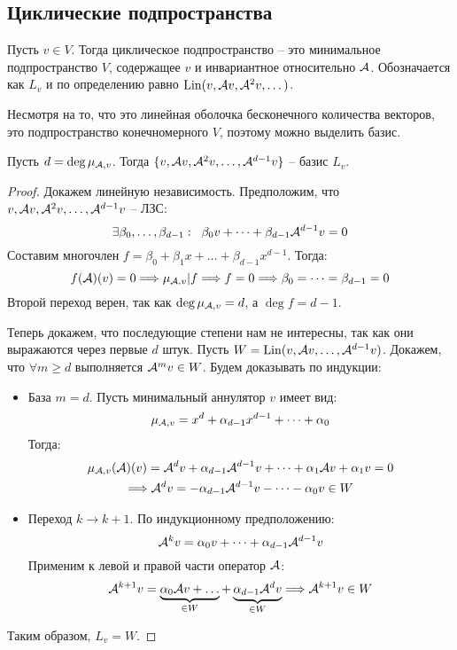 \subsection{Циклические подпространства}

\begin{conj}
    Пусть $v \in V$.
    Тогда циклическое подпространство -- это минимальное подпространство $V$, содержащее $v$ и инвариантное относительно $\mathcal{A}$.
    Обозначается как $L_v$ и по определению равно $\operatorname{Lin} (v, \mathcal{A} v, \mathcal{A}^2 v, \dots)$.
\end{conj}

\vspace*{3mm}

Несмотря на то, что это линейная оболочка бесконечного количества векторов, это подпространство конечномерного $V$, поэтому можно выделить базис.

\vspace*{2mm}

\begin{theorem}
    Пусть $d = \deg \mu_{\mathcal{A}, v}$.
    Тогда $\{ v, \mathcal{A} v, \mathcal{A}^2 v, \dots, \mathcal{A}^{d - 1} v \}$ -- базис $L_v$.
\end{theorem}

\begin{proof}
    Докажем линейную независимость.
    Предположим, что $v, \mathcal{A} v, \mathcal{A}^2 v, \dots, \mathcal{A}^{d - 1} v $ -- ЛЗС:
    \[ \exists \beta_0, \dots, \beta_{d-1} : \;\; \beta_0 v + \dots + \beta_{d - 1} \mathcal{A}^{d - 1} v = 0 \]
    \quad Составим многочлен $f = \beta_0 + \beta_1 x + \dots + \beta_{d - 1} x^{d - 1}$. 
    Тогда: \[ f(\mathcal{A})(v) = 0 \Longrightarrow \mu_{\mathcal{A}, v} | f \Longrightarrow f = 0 \Longrightarrow \beta_0 = \dots = \beta_{d - 1} = 0 \]
    \quad Второй переход верен, так как $\deg \mu_{\mathcal{A}, v} = d$, а $\deg f = d - 1$.
    
    \quad Теперь докажем, что последующие степени нам не интересны, так как они выражаются через первые $d$ штук.
    Пусть $W = \operatorname{Lin} (v, \mathcal{A} v, \dots, \mathcal{A}^{d - 1} v)$. 
    Докажем, что $\forall m \geqslant d$ выполняется $\mathcal{A}^m v \in W$.
    Будем доказывать по индукции: \begin{itemize}
        \item База $m = d$. Пусть минимальный аннулятор $v$ имеет вид: \[ \mu_{\mathcal{A}, v} = x^d + \alpha_{d - 1} x^{d - 1} + \dots + \alpha_0 \]
        Тогда: \begin{gather*}
            \mu_{\mathcal{A}, v}(\mathcal{A})(v) = \mathcal{A}^dv + \alpha_{d - 1} \mathcal{A}^{d - 1}v + \dots + \alpha_1 \mathcal{A} v + \alpha_1 v = 0 \\
            \Longrightarrow \mathcal{A}^d v = - \alpha_{d - 1} \mathcal{A}^{d - 1}v - \dots - \alpha_0 v \in W
        \end{gather*}
        \item Переход $k \to k + 1$.  
        По индукционному предположению: \[ \mathcal{A}^k v = \alpha_0 v + \dots + \alpha_{d - 1} \mathcal{A}^{d - 1}v \]
        Применим к левой и правой части оператор $\mathcal{A}$: \[ \mathcal{A}^{k+1}v = \underbrace{\alpha_0\mathcal{A} v + \dots}_{\in W} + \underbrace{\alpha_{d-1}\mathcal{A}^d v}_{\in W} \Longrightarrow \mathcal{A}^{k+1}v \in W \]
    \end{itemize}
    \quad Таким образом, $L_v = W$.
\end{proof}

